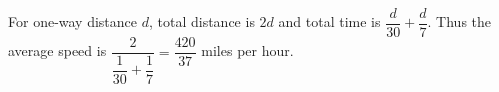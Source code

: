 For one-way distance $d$, total distance is $2d$ and total time is $\dfrac{d}{30}+\dfrac{d}{7}$. Thus the average speed is $\dfrac{2}{\dfrac{1}{30}+\dfrac{1}{7}}=\boxed{\dfrac{420}{37}}$ miles per hour.
